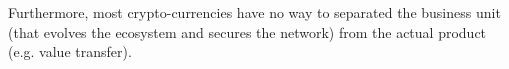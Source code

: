 Furthermore, most crypto-currencies have no way to separated the business unit
(that evolves the ecosystem and secures the network) from the actual product
(e.g. value transfer).
